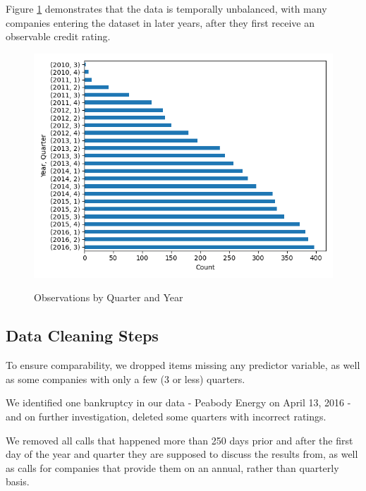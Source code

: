 \documentclass{article}[11pt]
\begin{document}
    Figure \ref{fig:obs-by-quarter-year} demonstrates that the data is temporally unbalanced, with many companies entering the dataset in later years, after they first receive an observable credit rating.

    \begin{figure}[h!]
		\centering
        \caption{Observations by Quarter and Year}
        \includegraphics[width=0.6\linewidth,keepaspectratio=true]{../Output/All Data EDA/Tabular EDA/all_data_fixed_quarter_dates_obs_by_year_quarter_no_title.png}
        \label{fig:obs-by-quarter-year}
	\end{figure}

    \clearpage
    \newpage

    \subsection{Data Cleaning Steps}

    \label{sec:data-cleaning}

    To ensure comparability, we dropped items missing any predictor variable, as well as some companies with only a few (3 or less) quarters. 
    
    We identified one bankruptcy in our data - Peabody Energy on April 13, 2016 - and on further investigation, deleted some quarters with incorrect ratings. 
    
    We removed all calls that happened more than 250 days prior and after the first day of the year and quarter they are supposed to discuss the results from, as well as calls for companies that provide them on an annual, rather than quarterly basis.
\end{document}
